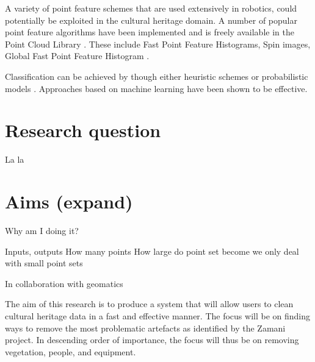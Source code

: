 \documentclass[10pt,twocolumn]{article}
\begin{document}




A variety of point feature schemes that are used extensively in robotics, could potentially be exploited in the cultural heritage domain. A number of popular point feature algorithms have been implemented and is freely available in the Point Cloud Library \cite{Rusu2011}. These include Fast Point Feature Histograms, Spin images, Global Fast Point Feature Histogram \cite{Rusu2011}.

Classification can be achieved by though either heuristic schemes \cite{Spina2010} or probabilistic models \cite{Shapovalov2010,Rusu2009}. Approaches based on machine learning have been shown to be effective.


\section{Research question}
La la

\section{Aims (expand)}
Why am I doing it?

Inputs, outputs
How many points
How large do point set become
we only deal with small point sets



In collaboration with geomatics

The aim of this research is to produce a system that will allow users to clean cultural heritage data in a fast and effective manner. The focus will be on finding ways to remove the most problematic artefacts as identified by the Zamani project. In descending order of importance, the focus will thus be on removing vegetation, people, and equipment. 
\end{document}
